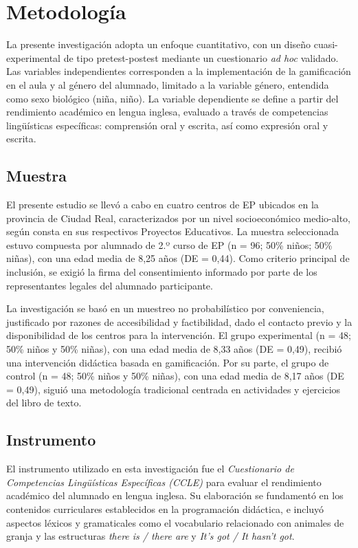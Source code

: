\documentclass[spanish]{textolivre}
\begin{document}
\section{Metodología}
La presente investigación adopta un enfoque cuantitativo, con un diseño cuasi-experimental de tipo pretest-postest mediante un cuestionario \textit{ad hoc} validado. Las variables independientes corresponden a la implementación de la gamificación en el aula y al género del alumnado, limitado a la variable género, entendida como sexo biológico (niña, niño). La variable dependiente se define a partir del rendimiento académico en lengua inglesa, evaluado a través de competencias lingüísticas específicas: comprensión oral y escrita, así como expresión oral y escrita.

\subsection{Muestra}
El presente estudio se llevó a cabo en cuatro centros de EP ubicados en la provincia de Ciudad Real, caracterizados por un nivel socioeconómico medio-alto, según consta en sus respectivos Proyectos Educativos. La muestra seleccionada estuvo compuesta por alumnado de 2.º curso de EP (n = 96; 50\% niños; 50\% niñas), con una edad media de 8,25 años (DE = 0,44). Como criterio principal de inclusión, se exigió la firma del consentimiento informado por parte de los representantes legales del alumnado participante.

La investigación se basó en un muestreo no probabilístico por conveniencia, justificado por razones de accesibilidad y factibilidad, dado el contacto previo y la disponibilidad de los centros para la intervención. El grupo experimental (n = 48; 50\% niños y 50\% niñas), con una edad media de 8,33 años (DE = 0,49), recibió una intervención didáctica basada en gamificación. Por su parte, el grupo de control (n = 48; 50\% niños y 50\% niñas), con una edad media de 8,17 años (DE = 0,49), siguió una metodología tradicional centrada en actividades y ejercicios del libro de texto. 

\subsection{Instrumento}
El instrumento utilizado en esta investigación fue el \textit{Cuestionario de Competencias Lingüísticas Específicas (CCLE)} para evaluar el rendimiento académico del alumnado en lengua inglesa. Su elaboración se fundamentó en los contenidos curriculares establecidos en la programación didáctica, e incluyó aspectos léxicos y gramaticales como el vocabulario relacionado con animales de granja y las estructuras \textit{there is / there are} y \textit{It's got / It hasn't got}.
\end{document}
